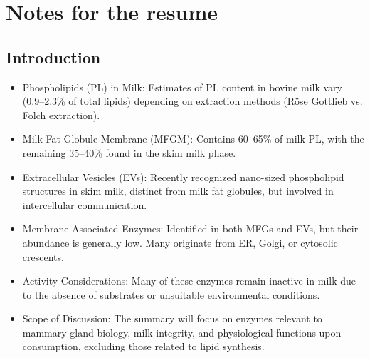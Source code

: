 \chapter{Notes for the resume}
\setlength{\headheight}{12.71342pt}
\addtolength{\topmargin}{-0.71342pt}


\section{Introduction}
\begin{itemize}
    \item Phospholipids (PL) in Milk: Estimates of PL content in bovine milk vary (0.9–2.3\% of total lipids) depending on extraction methods (Röse Gottlieb vs. Folch extraction).
    \item Milk Fat Globule Membrane (MFGM): Contains 60–65\% of milk PL, with the remaining 35–40\% found in the skim milk phase.
    \item Extracellular Vesicles (EVs): Recently recognized nano-sized phospholipid structures in skim milk, distinct from milk fat globules, but involved in intercellular communication.
    \item Membrane-Associated Enzymes: Identified in both MFGs and EVs, but their abundance is generally low. Many originate from ER, Golgi, or cytosolic crescents.
    \item Activity Considerations: Many of these enzymes remain inactive in milk due to the absence of substrates or unsuitable environmental conditions.
    \item Scope of Discussion: The summary will focus on enzymes relevant to mammary gland biology, milk integrity, and physiological functions upon consumption, excluding those related to lipid synthesis.
\end{itemize}

